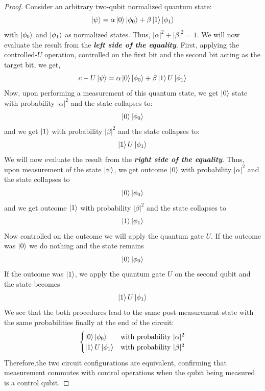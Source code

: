 \begin{proof}
    Consider an arbitrary two-qubit normalized quantum state:
    \[
    \ket{\psi}= \alpha\ket{0}\ket{\phi_0} + \beta\ket{1}\ket{\phi_1}
    \]
    with $\ket{\phi_0}$ and $\ket{\phi_1}$ as normalized states. Thus, $|\alpha|^2+|\beta|^2=1$.
    We will now evaluate the result from the \textbf{\textit{left side of the equality}}. First, applying the controlled-$U$ operation, controlled on the first bit and the second bit acting as the target bit, we get,
    \[
    c-U\ket{\psi}= \alpha\ket{0}\ket{\phi_0} + \beta\ket{1}U\ket{\phi_1}
    \]
    Now, upon performing a measurement of this quantum state, we get $\ket{0}$ state with probability $|\alpha|^2$ and the state collapses to:
    \[
    \ket{0}\ket{\phi_0}
    \]
    and we get $\ket{1}$ with probability $|\beta|^2$ and the state collapses to:
    \[
    \ket{1}U\ket{\phi_1}
    \]
    We will now evaluate the result from the \textbf{\textit{right side of the equality}}. Thus, upon measurement of the state $\ket{\psi}$, we get outcome $\ket{0}$ with probability $|\alpha|^2$ and the state collapses to
    \[
    \ket{0}\ket{\phi_0}
    \]
    and we get outcome $\ket{1}$ with probability $|\beta|^2$ and the state collapses to
    \[
    \ket{1}\ket{\phi_1}
    \]
    Now controlled on the outcome we will apply the quantum gate $U$. If the outcome was $\ket{0}$ we do nothing and the state remains
    \[
    \ket{0}\ket{\phi_0}
    \]
    If the outcome was $\ket{1}$, we apply the quantum gate $U$ on the second qubit and the state becomes
    \[
    \ket{1}U\ket{\phi_1}
    \]
    We see that the both procedures lead to the same post-measurement state with the same probabilities finally at the end of the circuit:
    \[
    \begin{cases}
        \ket{0}\ket{\phi_0} &\text{with probability $|\alpha|^2$}\\
        \ket{1}U\ket{\phi_1} &\text{with probability $|\beta|^2$}
    \end{cases}
    \]
    Therefore,the two circuit configurations are equivalent, confirming that measurement commutes with control operations when the qubit being measured is a control qubit.
\end{proof}

